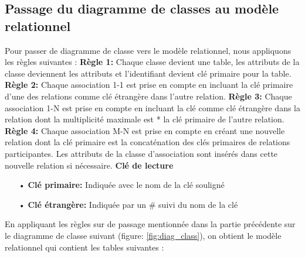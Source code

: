 \documentclass[edit,12pt,a4paper,ChapStyle,oneside,doubleinterligne]{report}
\begin{document}
\subsection{Passage du diagramme de classes au modèle relationnel }
Pour passer de diagramme de classe vers le modèle relationnel, nous appliquons les règles suivantes :
\newline
\textbf{Règle 1: }Chaque classe devient une table, les attributs de la classe deviennent
les attributs et l’identifiant devient clé primaire pour la table.
\newline
\textbf{Règle 2: }Chaque association 1-1 est prise en compte en incluant la clé primaire
d’une des relations comme clé étrangère dans l’autre relation.
\newline
\textbf{Règle 3: }Chaque association 1-N est prise en compte en incluant la clé comme
clé étrangère dans la relation dont la multiplicité maximale est * la clé primaire
de l’autre relation.
\newline
\textbf{Règle 4: }Chaque association M-N est prise en compte en créant une nouvelle
relation dont la clé primaire est la concaténation des clés primaires de relations
participantes. Les attributs de la classe d’association sont insérés dans cette nouvelle relation si nécessaire.
\newline \phantom{hassane} \newline
\textbf{Clé de lecture}
\begin{itemize}
    \item [•] \textbf{Clé primaire: }Indiquée avec le nom de la clé souligné
    \item [•] \textbf{Clé étrangère: }Indiquée par un \# suivi du nom de la clé
\end{itemize}
En appliquant les règles sur de passage mentionnée dans la partie précédente sur le diagramme de classe suivant (figure: \ref{fig:diag_class}), on obtient le modèle relationnel qui contient les tables suivantes :
\end{document}
